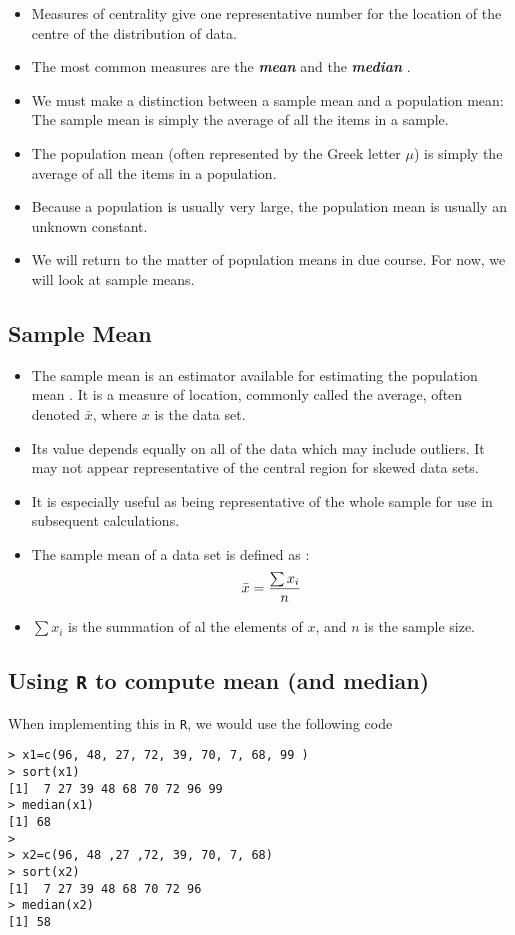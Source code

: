 \documentclass[]{report}
\begin{document}
\begin{itemize}
\item Measures of centrality give one representative number for the location of the centre of the distribution of data.
\item
The most common measures are the \textbf{\emph{mean}} and the \textbf{\emph{ median }}.
\item We must make a distinction between a sample mean and a population mean: The sample mean is simply the average of all the items in a sample.  \item The population mean (often represented by the Greek letter $\mu$) is simply the average of all the items in a population. \item Because a population is usually very large, the population mean is usually an unknown constant.
\item We will return to the matter of population means in due course. For now, we will look at sample means.
\end{itemize}



\subsection{Sample Mean}

\begin{itemize}
\item The sample mean is an estimator available for estimating the population mean . It is a measure of location, commonly called the average, often denoted $\bar{x}$, where $x$ is the data set.
\item
Its value depends equally on all of the data which may include outliers. It may not appear representative of the central region for skewed data sets.
\item
It is especially useful as being representative of the whole sample for use in subsequent calculations.
\item The sample mean of a data set is defined as :
\[ \bar{x} = { \sum x_i\over n}\]
\item $\sum x_i$ is the summation of al the elements of $x$, and $n$ is the sample size.
\end{itemize}


{




\subsection{Using \texttt{R} to compute mean (and median)}
When implementing this in \texttt{R}, we would use the following code

\begin{verbatim}
> x1=c(96, 48, 27, 72, 39, 70, 7, 68, 99 )
> sort(x1)
[1]  7 27 39 48 68 70 72 96 99
> median(x1)
[1] 68
>
> x2=c(96, 48 ,27 ,72, 39, 70, 7, 68)
> sort(x2)
[1]  7 27 39 48 68 70 72 96
> median(x2)
[1] 58
\end{verbatim}





}
\end{document}
